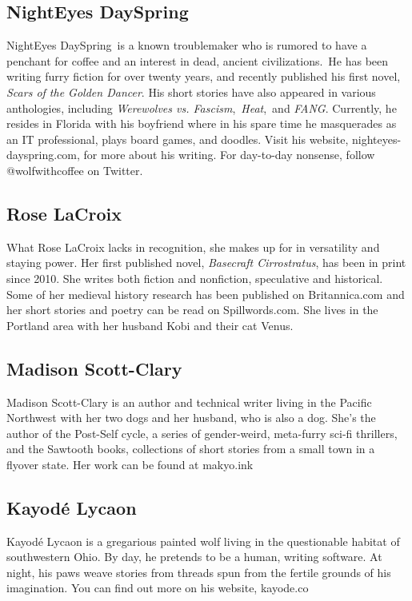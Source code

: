 \subsection*{NightEyes DaySpring}
NightEyes DaySpring is a known troublemaker who is rumored to have a penchant for coffee and an interest in dead, ancient civilizations. He has been writing furry fiction for over twenty years, and recently published his first novel, \emph{Scars of the Golden Dancer}. His short stories have also appeared in various anthologies, including \emph{Werewolves vs. Fascism}, \emph{Heat}, and \emph{FANG}. Currently, he resides in Florida with his boyfriend where in his spare time he masquerades as an IT professional, plays board games, and doodles. Visit his website, nighteyes-dayspring.com, for more about his writing. For day-to-day nonsense, follow @wolfwithcoffee on Twitter.

\subsection*{Rose LaCroix}

What Rose LaCroix lacks in recognition, she makes up for in versatility and staying power. Her first published novel, \emph{Basecraft Cirrostratus}, has been in print since 2010. She writes both fiction and nonfiction, speculative and historical. Some of her medieval history research has been published on Britannica.com and her short stories and poetry can be read on Spillwords.com. She lives in the Portland area with her husband Kobi and their cat Venus.

\subsection*{Madison Scott-Clary}
Madison Scott-Clary is an author and technical writer living in the Pacific Northwest with her two dogs and her husband, who is also a dog. She's the author of the Post-Self cycle, a series of gender-weird, meta-furry sci-fi thrillers, and the Sawtooth books, collections of short stories from a small town in a flyover state. Her work can be found at makyo.ink

\subsection*{Kayodé Lycaon}
Kayodé Lycaon is a gregarious painted wolf living in the questionable habitat of southwestern Ohio. By day, he pretends to be a human, writing software. At night, his paws weave stories from threads spun from the fertile grounds of his imagination. You can find out more on his website, kayode.co

